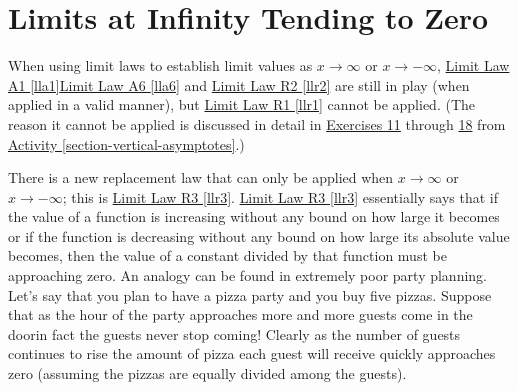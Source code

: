 \documentclass[10pt,oneside,]{book}
\theoremstyle{plain}
\theoremstyle{definition}
\numberwithin{equation}{section}
\begin{document}
\section[Limits at Infinity Tending to Zero]{Limits at Infinity Tending to Zero}\label{section-limits-at-infinity-tending-to-zero}
When using limit laws to establish limit values as \(x\to\infty\) or \(x\to-\infty\), \hyperref[lla1]{Limit Law A1 \ref{lla1}}\textendash{}\hyperref[lla6]{Limit Law A6 \ref{lla6}} and  \hyperref[llr2]{Limit Law R2 \ref{llr2}} are still in play (when applied in a valid manner), but \hyperref[llr1]{Limit Law R1 \ref{llr1}} cannot be applied. (The reason it cannot be applied is discussed in detail in \hyperlink{exercise-hear-me-first}{Exercises 11} through \hyperlink{exercise-hear-me-last}{18} from \hyperref[section-vertical-asymptotes]{Activity \ref{section-vertical-asymptotes}}.)%
\par
There is a new replacement law that can only be applied when \(x\to\infty\) or \(x\to-\infty\); this is \hyperref[llr3]{Limit Law R3 \ref{llr3}}. \hyperref[llr3]{Limit Law R3 \ref{llr3}} essentially says that if the value of a function is increasing without any bound on how large it becomes or if the function is decreasing without any bound on how large its absolute value becomes, then the value of a constant divided by that function must be approaching zero. An analogy can be found in extremely poor party planning. Let's say that you plan to have a pizza party and you buy five pizzas. Suppose that as the hour of the party approaches more and more guests come in the door\textemdash{}in fact the guests never stop coming! Clearly as the number of guests continues to rise the amount of pizza each guest will receive quickly approaches zero (assuming the pizzas are equally divided among the guests).%
\typeout{************************************************}
\typeout{************************************************}
\end{document}
